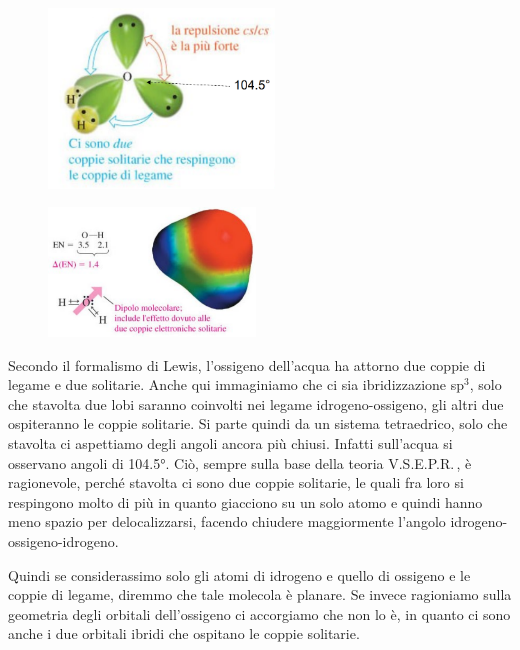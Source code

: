 \hspace{2cm}\begin{minipage}{0.4\textwidth}
    \begin{figure}[H]
        \includegraphics[width=6cm]{immagini/acqua.png}
    \end{figure}
\end{minipage}
\begin{minipage}{0.3\textwidth}
    \begin{figure}[H]
        \includegraphics[width=5.5cm]{immagini/dipolo-acqua.png}
    \end{figure}
\end{minipage}

\vspace{0.2cm}Secondo il formalismo di Lewis, l'ossigeno dell'acqua ha attorno due coppie di legame e due solitarie. Anche qui immaginiamo che ci sia ibridizzazione sp$^3$, solo che stavolta due lobi saranno coinvolti nei legame idrogeno-ossigeno, gli altri due ospiteranno le coppie solitarie. Si parte quindi da un sistema tetraedrico, solo che stavolta ci aspettiamo degli angoli ancora più chiusi. Infatti sull'acqua si osservano angoli di 104.5°. Ciò, sempre sulla base della teoria V.S.E.P.R.\,, è ragionevole, perché stavolta ci sono due coppie solitarie, le quali fra loro si respingono molto di più in quanto giacciono su un solo atomo e quindi hanno meno spazio per delocalizzarsi, facendo chiudere maggiormente l'angolo idrogeno-ossigeno-idrogeno.

Quindi se considerassimo solo gli atomi di idrogeno e quello di ossigeno e le coppie di legame, diremmo che tale molecola è planare. Se invece ragioniamo sulla geometria degli orbitali dell'ossigeno ci accorgiamo che non lo è, in quanto ci sono anche i due orbitali ibridi che ospitano le coppie solitarie.

